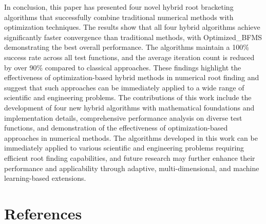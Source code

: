 \documentclass[reprint, amsmath, amssymb, aps, prl]{revtex4-2}
\begin{document}
In conclusion, this paper has presented four novel hybrid root bracketing algorithms that successfully combine traditional numerical methods with optimization techniques. The results show that all four hybrid algorithms achieve significantly faster convergence than traditional methods, with Optimized\_BFMS demonstrating the best overall performance. The algorithms maintain a 100\% success rate across all test functions, and the average iteration count is reduced by over 90\% compared to classical approaches. These findings highlight the effectiveness of optimization-based hybrid methods in numerical root finding and suggest that such approaches can be immediately applied to a wide range of scientific and engineering problems. The contributions of this work include the development of four new hybrid algorithms with mathematical foundations and implementation details, comprehensive performance analysis on diverse test functions, and demonstration of the effectiveness of optimization-based approaches in numerical methods. The algorithms developed in this work can be immediately applied to various scientific and engineering problems requiring efficient root finding capabilities, and future research may further enhance their performance and applicability through adaptive, multi-dimensional, and machine learning-based extensions.

\section*{References}
\end{document}
